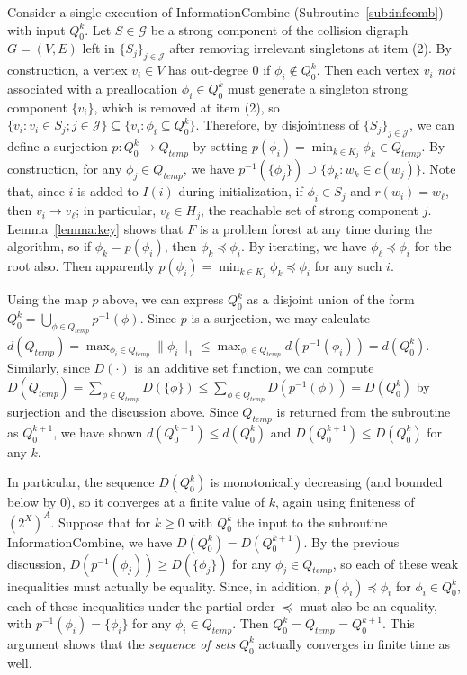 \documentclass[11pt,reqno]{amsart}
\theoremstyle{definition}
\numberwithin{equation}{section}
\newcommand{\inv}{^{-1}}
\newcommand{\pre}{\phi}
\newcommand{\prealloc}{(2^X)^A}
\newcommand{\sub}{\subseteq}
\newcommand{\peq}{\preceq}
\newcommand{\strongc}{\mathcal{G}}
\newcommand{\strongcomp}{S}
\newcommand{\acto}{Q_0}
\newcommand{\actok}{Q_0^k}
\newcommand{\actt}{Q_{temp}}
\newcommand{\disto}{d}
\newcommand{\distt}{D}
\newcommand{\coll}{I}
\newcommand{\reach}{H}
\newcommand{\forest}{F}
\newcommand{\infcombgraphii}{(2)\xspace}
\begin{document}
Consider a single execution of InformationCombine (Subroutine~\ref{sub:infcomb}) with input $\actok$.
Let $\strongcomp \in \strongc$ be a strong component of the collision digraph $G = (V,E)$ left in $\{\strongcomp_j\}_{j \in \mathcal{J}}$ after removing irrelevant singletons at item \infcombgraphii.
By construction, a vertex $v_i \in V$ has out-degree $0$ if $\pre_i \not \in \actok$.
Then each vertex $v_i$ \emph{not} associated with a preallocation $\pre_i \in \actok$ must generate a singleton strong component $\{v_i\}$, which is removed at item \infcombgraphii, so $\{v_i: v_i \in \strongcomp_j; j \in \mathcal{J}\} \sub \{v_i: \pre_i \sub \actok\}$. 
Therefore, by disjointness of $\{\strongcomp_j\}_{j \in \mathcal{J}}$, we can define a surjection $p: \actok \to \actt$ by setting $p(\pre_i) = \min_{k \in K_j} \pre_k \in \actt$. 
By construction, for any $\pre_j \in \actt$, we have $p\inv(\{\pre_j\}) \supseteq \{\pre_k: w_k \in c(w_j)\}$. 
Note that, since $i$ is added to $\coll(i)$ during initialization, if $\pre_i \in \strongcomp_j$ and $r(w_i) = w_{\ell}$, then $v_i \to v_{\ell}$; in particular, $v_{\ell} \in \reach_j$, the reachable set of strong component $j$.
Lemma~\ref{lemma:key} shows that $\forest$ is a problem forest at any time during the algorithm, so if $\pre_k = p(\pre_i)$, then $\pre_k \peq \pre_i$.
By iterating, we have $\pre_{\ell} \peq \pre_i$ for the root also.
Then apparently $p(\pre_i) = \min_{k \in K_j} \pre_k \peq \pre_i$ for any such $i$. 

Using the map $p$ above, we can express $\actok$ as a disjoint union of the form $\actok = \bigcup_{\pre \in \actt} p\inv(\pre)$.
Since $p$ is a surjection, we may calculate $\disto(\actt) = \max_{\pre_i \in \actt} \|\pre_i\|_1 \leq \max_{\pre_i \in \actt} \disto(p\inv(\pre_i)) = \disto(\actok)$. 
Similarly, since $\distt(\cdot)$ is an additive set function, we can compute $\distt(\actt) = \sum_{\pre \in \actt} \distt(\{\pre\}) \leq \sum_{\pre \in \actt} \distt(p\inv(\pre)) = \distt(\actok)$ by surjection and the discussion above.
Since $\actt$ is returned from the subroutine as $\acto^{k + 1}$, we have shown $\disto(\acto^{k+1}) \leq \disto(\actok)$ and $\distt(\acto^{k+1}) \leq \distt(\actok)$ for any $k$. 

In particular, the sequence $\distt(\actok)$ is monotonically decreasing (and bounded below by 0), so it converges at a finite value of $k$, again using finiteness of $\prealloc$. 
Suppose that for $k \geq 0$ with $\actok$ the input to the subroutine InformationCombine, we have $\distt(\actok) = \distt(\acto^{k+1})$.
By the previous discussion, $\distt(p\inv(\pre_j)) \geq \distt(\{\pre_j\})$ for any $\pre_j \in \actt$, so each of these weak inequalities must actually be equality. 
Since, in addition, $p(\pre_i) \peq \pre_i$ for $\pre_i \in \actok$, each of these inequalities under the partial order $\peq$ must also be an equality, with $p\inv(\pre_i) = \{\pre_i\}$ for any $\pre_i \in \actt$.
Then $\actok = \actt = \acto^{k+1}$. 
This argument shows that the \emph{sequence of sets} $\actok$ actually converges in finite time as well. 
\end{document}
